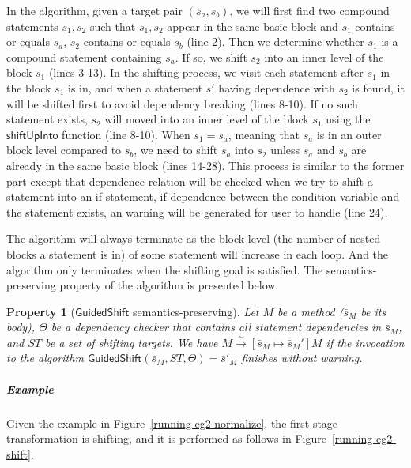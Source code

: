 \documentclass[letterpaper, USenglish]{lipics-v2016}
\theoremstyle{plain}
\newtheorem{property}[theorem]{Property}
\begin{document}
In the algorithm, given a target pair $(s_a, s_b)$, we will first
 find two compound statements $s_1, s_2$ such that $s_1,s_2$ appear in the same basic block and $s_1$ contains or equals $s_a$, $s_2$ contains or equals $s_b$ (line 2). Then we determine whether $s_1$ is a compound statement containing $s_a$. If so, we shift $s_2$ into an inner level of the block $s_1$ (lines 3-13). In the shifting process, we visit each statement after $s_1$ in the block $s_1$ is in, and when a statement $s'$ having dependence with $s_2$ is found, it will be shifted first to avoid dependency breaking (lines 8-10). If no such statement exists, $s_2$ will moved into an inner level of the block $s_1$ using the $\mathsf{shiftUpInto}$ function (line 8-10). When $s_1=s_a$, meaning that $s_a$ is in an outer block level compared to $s_b$, we need to shift $s_a$ into $s_2$ unless $s_a$ and $s_b$ are already in the same basic block (lines 14-28). This process is similar to the former part except that dependence relation will be checked when we try to shift a statement into an if statement, if dependence between the condition variable and the statement exists, an warning will be generated for user to handle (line 24). 

The algorithm will always terminate as the block-level (the number of nested blocks a statement is in) of some statement will increase in each loop. And the algorithm only terminates when the shifting goal is satisfied. The semantics-preserving property of the algorithm is presented below.

\begin{property}[$\mathsf{GuidedShift}$ semantics-preserving]\label{property:guidedshiftsafe}
Let $M$ be a method ($\bar{s}_M$ be its body), $\Theta$ be a dependency
checker that contains all statement dependencies in $\bar{s}_M$, and
$\mathit{ST}$ be a set of shifting targets. We have
$M\xrightarrow{\sim}[\bar{s}_M\mapsto\bar{s}_M']M$ if the invocation
to the algorithm
$\mathsf{GuidedShift}(\bar{s}_M,\mathit{ST},\Theta)=\bar{s}'_M$
finishes without warning.  
\end{property}

\subparagraph*{Example} Given the example in Figure~\ref{running-eg2-normalize}, the first stage transformation is shifting, and it is performed as follows in Figure~\ref{running-eg2-shift}.
\end{document}
